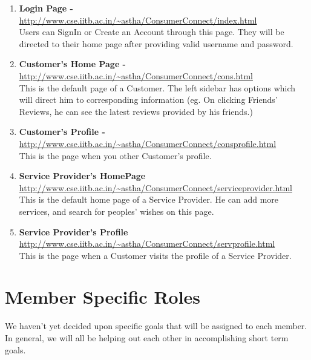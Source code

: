 \documentclass[a4paper]{article}
\begin{document}
\begin{enumerate}
\item \textbf{Login Page - } \url{http://www.cse.iitb.ac.in/~astha/ConsumerConnect/index.html} \\ Users can SignIn or Create an Account through this page. They will be directed to their home page after providing valid username and password. 

\item \textbf{Customer's Home Page - }
\url{http://www.cse.iitb.ac.in/~astha/ConsumerConnect/cons.html} \\ This is the default page of a Customer. The left sidebar has options which will direct him to corresponding information (eg. On clicking Friends' Reviews, he can see the latest reviews provided by his friends.)

\item \textbf{Customer's Profile - }
\url{http://www.cse.iitb.ac.in/~astha/ConsumerConnect/consprofile.html}\\This is the page when you other Customer's profile.

\item \textbf{Service Provider's HomePage} 
\url{http://www.cse.iitb.ac.in/~astha/ConsumerConnect/serviceprovider.html} \\ This is the default home page of a Service Provider. He can add more services, and search for peoples' wishes on this page. 

\item \textbf{Service Provider's Profile}
\url{http://www.cse.iitb.ac.in/~astha/ConsumerConnect/servprofile.html}\\ This is the page when a Customer visits the profile of a Service Provider.


\end{enumerate}




\section{Member Specific Roles}
We haven't yet decided upon specific goals that will be assigned to each member. In general, we will all be helping out each other in accomplishing short term goals.
\end{document}
